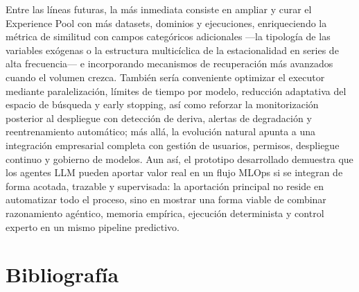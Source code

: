 \documentclass[12pt,a4paper]{article}
\theoremstyle{plain}
\begin{document}
Entre las líneas futuras, la más inmediata consiste en ampliar y curar el Experience Pool con más datasets, dominios y ejecuciones, enriqueciendo la métrica de similitud con campos categóricos adicionales ---la tipología de las variables exógenas o la estructura multicíclica de la estacionalidad en series de alta frecuencia--- e incorporando mecanismos de recuperación más avanzados cuando el volumen crezca. También sería conveniente optimizar el executor mediante paralelización, límites de tiempo por modelo, reducción adaptativa del espacio de búsqueda y early stopping, así como reforzar la monitorización posterior al despliegue con detección de deriva, alertas de degradación y reentrenamiento automático; más allá, la evolución natural apunta a una integración empresarial completa con gestión de usuarios, permisos, despliegue continuo y gobierno de modelos. Aun así, el prototipo desarrollado demuestra que los agentes LLM pueden aportar valor real en un flujo MLOps si se integran de forma acotada, trazable y supervisada: la aportación principal no reside en automatizar todo el proceso, sino en mostrar una forma viable de combinar razonamiento agéntico, memoria empírica, ejecución determinista y control experto en un mismo pipeline predictivo.



\newpage
\renewcommand{\refname}{Bibliografía}
{}
\section*{Bibliografía}





\newpage

\appendix
\renewcommand{\thesection}{Anexo \Alph{section}}
\renewcommand{\thesubsection}{\Alph{section}.\arabic{subsection}}
\end{document}
